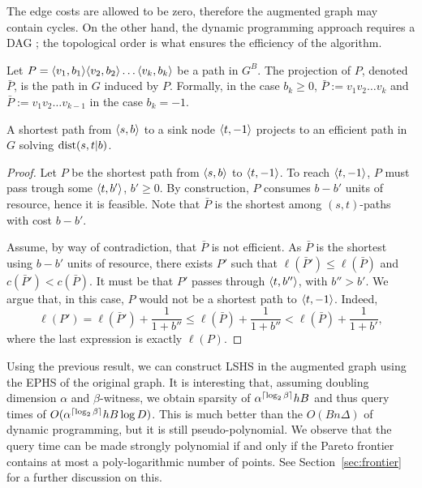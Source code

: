 \begin{remark}
The edge costs are allowed to be zero, therefore the augmented graph may contain cycles.
On the other hand, the dynamic programming approach requires a DAG \cite{alex_bicriteria}; the topological order is what ensures the efficiency of the algorithm.
\end{remark}

\begin{definition}
Let $P=\langle v_1,b_1\rangle\langle v_2,b_2\rangle\ldots\langle v_k,b_k\rangle$ be a path in $G^B$.
The projection of $P$, denoted $\bar P$, is the path in $G$ induced by $P$. 
Formally, in the case $b_k\geq 0$, $\bar P:=v_1v_2\ldots v_k$ and $\bar P:=v_1v_2\ldots v_{k-1}$ in the case $b_k=-1$. 
\end{definition}


\begin{proposition}\label{prop:shorteffic}
A shortest path from $\langle s,b\rangle$ to a sink node $\langle t,-1\rangle$ projects to an efficient path in $G$ solving $\text{dist}(s,t|b)$. 
\end{proposition}
\begin{proof}
Let $P$ be the shortest path from $\langle s,b\rangle$ to $\langle t,-1\rangle$.
To reach $\langle t,-1\rangle$, $P$ must pass trough some $\langle t,b'\rangle$, $b'\geq 0$.
By construction, $P$ consumes $b-b'$ units of resource, hence it is feasible.
Note that $\bar P$ is the shortest among $(s,t)$-paths with cost $b-b'$.

Assume, by way of contradiction, that $\bar P$ is not efficient.
As $\bar P$ is the shortest using $b-b'$ units of resource, there exists $P'$ such that $\ell(\bar P')\leq \ell(\bar P)$ and $c(\bar P')< c(\bar P)$.
It must be that $P'$ passes through $\langle t,b''\rangle$, with $b''>b'$.
We argue that, in this case, $P$ would not be a shortest path to $\langle t,-1\rangle$.
Indeed, 
\[
\ell(P')=\ell(\bar P')+\frac{1}{1+b''}
\leq \ell(\bar P) +\frac{1}{1+b''}
< \ell(\bar P) +\frac{1}{1+b'},
\]
where the last expression is exactly $\ell(P)$.
\end{proof}

Using the previous result, we can construct LSHS in the augmented graph using the EPHS of the original graph.
It is interesting that, assuming doubling dimension $\alpha$ and $\beta$-witness, we obtain sparsity of $\alpha^{\lceil\log_2\beta\rceil} hB$ and thus query times of $O(\alpha^{\lceil\log_2\beta\rceil} hB\log D)$.
This is much better than the $O(Bn\Delta)$ of dynamic programming, but it is still pseudo-polynomial.
We observe that the query time can be made strongly polynomial if and only if the Pareto frontier contains at most a poly-logarithmic number of points.
See Section~\ref{sec:frontier} for a further discussion on this.
 
